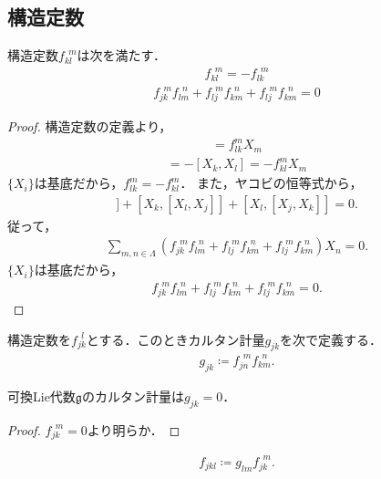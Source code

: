\subsection{構造定数}
\begin{cor}[構造定数の性質]
	構造定数\(f_{kl}^{\ \ m}\)は次を満たす．
	\begin{align}
		f_{kl}^{\ \ m}=-f_{lk}^{\ \ m}
	\end{align}
	\begin{align}
		f_{jk}^{\ \ m}f_{lm}^{\ \ n}+f_{lj}^{\ \ m}f_{km}^{\ \ n}+f_{lj}^{\ \ m}f_{km}^{\ \ n}=0
	\end{align}
\end{cor}
\begin{proof}
	構造定数の定義より，
	\begin{align}
		[X_{l},X_{k}]=f_{lk}^{m}X_{m}
	\end{align}
	\begin{align}
		=-[X_{k},X_{l}]=-f_{kl}^{m}X_{m}
	\end{align}
	\(\{X_{i}\}\)は基底だから，\(f_{lk}^{m}=-f_{kl}^{m}\)．
	また，ヤコビの恒等式から，
	\begin{align}
		[X_{j},[X_{k},X_{l}]]+[X_{k},[X_{l},X_{j}]]+[X_{l},[X_{j},X_{k}]]=0.
	\end{align}
	従って，
	\begin{align}
		\sum_{m,n\in{}\Lambda}(f_{jk}^{\ \ m}f_{lm}^{\ \ n}+f_{lj}^{\ \ m}f_{km}^{\ \ n}+f_{lj}^{\ \ m}f_{km}^{\ \ n})X_{n}=0.
	\end{align}
	\(\{X_{i}\}\)は基底だから，
	\begin{align}
		f_{jk}^{\ \ m}f_{lm}^{\ \ n}+f_{lj}^{\ \ m}f_{km}^{\ \ n}+f_{lj}^{\ \ m}f_{km}^{\ \ n}=0.
	\end{align}
\end{proof}
\begin{defn}
	構造定数を\(f_{jk}^{\ \ l}\)とする．このときカルタン計量\(g_{jk}\)を次で定義する．
	\begin{align}
		g_{jk}\coloneqq{}f_{jn}^{\ \ m}f_{km}^{\ \ n}.
	\end{align}
\end{defn}
\begin{eg}
	可換Lie代数\(\mathfrak{g}\)のカルタン計量は\(g_{jk}=0\)．
	\begin{proof}
		\(f_{jk}^{\ \ m}=0\)より明らか．
	\end{proof}
\end{eg}
\begin{defn}[添字の降ろし方]
	\begin{align}
		f_{jkl}\coloneqq{}g_{lm}f_{jk}^{\ \ m}.
	\end{align}
\end{defn}
